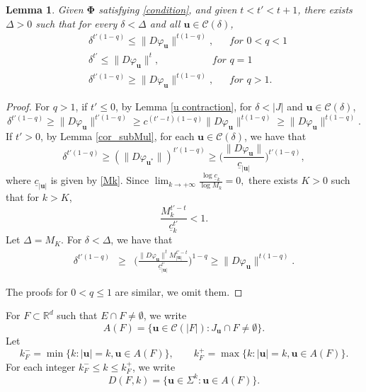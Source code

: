 \documentclass[12pt]{amsart}
\theoremstyle{plain}
\newtheorem{lem}[thm]{Lemma}
\theoremstyle{definition}
\theoremstyle{remark}
\newcommand{\bu}{\mathbf{u}}
\begin{document}
\begin{lem}\label{condition app}
Given  $\boldsymbol{\Phi}$  satisfying \eqref{condition}, and given $t<t'<t+1$, there exists  $\Delta>0$ such that for every $\delta<\Delta$ and all  $\bu\in\mathcal{C}(\delta)$, 
\begin{equation*}\begin{split}
&\delta^{t'(1-q)}\le\|D\varphi_\bu\|^{t(1-q)}, \quad \ \textit{ for $0<q<1$} \\ 
&\delta^{t'}\le\|D\varphi_\bu\|^{t}, \qquad\qquad\quad \textit{ for $q=1$} \\ 
&\delta^{t'(1-q)}\ge\|D\varphi_\bu\|^{t(1-q)},  \quad \ \textit{ for $q>1$}. 
\end{split}
\end{equation*}
\end{lem}

\begin{proof}
For $q>1$, if $t'\leq 0$, by Lemma \ref{u contraction}, for $\delta<|J|$ and   $\bu\in\mathcal{C}(\delta)$,  
$$
\delta^{t'(1-q)}\ge \|D\varphi_\bu\|^{t'(1-q)}\ge c^{(t'-t)(1-q)}\|D\varphi_\bu\|^{t(1-q)}\ge \|D\varphi_\bu\|^{t(1-q)}.
$$
If $t'>0$, by Lemma \ref{cor_subMul}, for each  $\bu\in\mathcal{C}(\delta)$,  we have that
$$
\delta^{t'(1-q)}\ge(\|D\varphi_{\mathbf{u}^*}\|)^{t'(1-q)}   \ge \Big(\frac{\|D\varphi_\mathbf{u}\|}{\underline c_{|\mathbf{u}|}}\Big)^{t'(1-q)}, 
$$
where $\underline c_{|\mathbf{u}|}$ is given by \eqref{Mk}. Since $\lim_{k\to +\infty} \frac{\log\underline c_k}{\log M_k}=0,$ there exists $K>0$ such that for $k>K$, 
$$
\frac{ M_k^{t'-t}}{\underline c_k^{t'}}<1.
$$
Let  $\Delta=M_K$. For $\delta<\Delta$, we have that 
\begin{eqnarray*}
\delta^{t'(1-q)}&\ge&\Big(\frac{\|D\varphi_\mathbf{u}\|^tM_{|\bu|}^{t'-t}}{\underline c_{|\mathbf{u}|}^{t'}}\Big)^{1-q}    \ge \|D\varphi_\mathbf{u}\|^{t(1-q)}.
\end{eqnarray*}
  
The proofs for $0<q\le1$ are similar, we omit them.
\end{proof}





















For  $F\subset \mathbb{R}^d$ such that  $E\cap F\ne \emptyset$, we write
\begin{equation}\label{def_Aset}
A(F)=\{\mathbf{u}\in \mathcal{C}(|F|): J_\mathbf{u}\cap F \ne \emptyset\}.
\end{equation}
Let
\begin{equation}\label{def_k0}
k_F^- = \min\{k:|\mathbf{u}|=k, \mathbf{u}\in A(F)\}, \qquad
k_F^+ = \max\{k:|\mathbf{u}|=k, \mathbf{u}\in A(F)\}.
\end{equation}
For each integer $k_F^-\le k\leq k_F^+$, we write
\begin{equation}\label{def_DFk}
D(F, k)=\{\mathbf{u} \in \Sigma^k :\mathbf{u} \in A(F)\}.
\end{equation}
\end{document}
